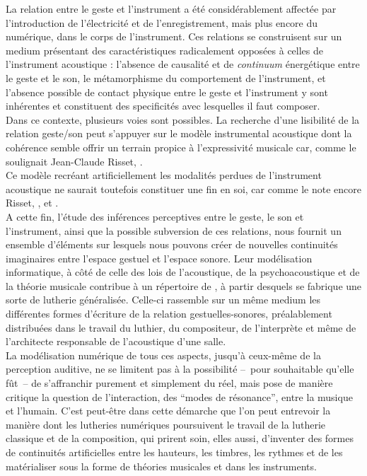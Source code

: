 \noindent La relation entre le geste et l'instrument a été considérablement affectée par l'introduction de l'électricité et de l'enregistrement, mais plus encore du numérique, dans le corps de l'instrument. Ces relations se construisent sur un medium présentant des caractéristiques radicalement opposées à celles de l'instrument acoustique : l'absence de causalité et de \textit{continuum} énergétique entre le geste et le son, le métamorphisme du comportement de l'instrument, et l'absence possible de contact physique entre le geste et l'instrument y sont inhérentes et constituent des specificités avec lesquelles il faut composer.\\
\indent Dans ce contexte, plusieurs voies sont possibles. La recherche d'une lisibilité de la relation geste/son peut s'appuyer sur le modèle instrumental acoustique dont la cohérence semble offrir un terrain propice à l'expressivité musicale car, comme le soulignait Jean-Claude Risset,  \cite{risset_son_1992}.\\
\indent Ce modèle recréant artificiellement les modalités perdues de l'instrument acoustique ne saurait toutefois constituer une fin en soi, car comme le note encore Risset,  \cite{risset_propos_2010}, et  \cite{risset_son_1992}.\\
\indent A cette fin, l'étude des inférences perceptives entre le geste, le son et l'instrument, ainsi que la possible subversion de ces relations, nous fournit un ensemble d'éléments sur lesquels nous pouvons créer de nouvelles continuités imaginaires entre l'espace gestuel et l'espace sonore. Leur modélisation informatique, à côté de celle des lois de l'acoustique, de la psychoacoustique et de la théorie musicale contribue à un répertoire de , à partir desquels se fabrique une sorte de lutherie généralisée. Celle-ci rassemble sur un même medium les différentes formes d'écriture de la relation gestuelles-sonores, préalablement distribuées dans le travail du luthier, du compositeur, de l'interprète et même de l'architecte responsable de l'acoustique d'une salle.\\
\indent La modélisation numérique de tous ces aspects, jusqu'à ceux-même de la perception auditive, ne se limitent pas à la possibilité --~pour souhaitable qu'elle fût~-- de s'affranchir purement et simplement du réel, mais pose de manière critique la question de l'interaction, des ``modes de résonance'', entre la musique et l'humain. C'est peut-être dans cette démarche que l'on peut entrevoir la manière dont les lutheries numériques poursuivent le travail de la lutherie classique et de la composition, qui prirent soin, elles aussi, d'inventer des formes de continuités artificielles entre les hauteurs, les timbres, les rythmes et de les matérialiser sous la forme de théories musicales et dans les instruments.

